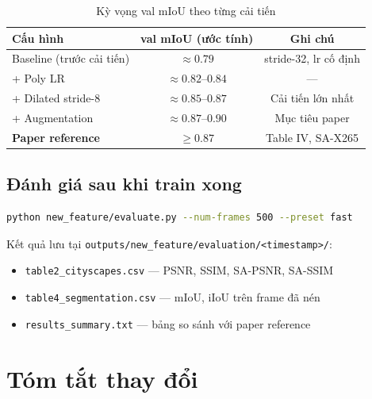 \documentclass[12pt,a4paper]{article}
\begin{document}
\begin{table}[H]
  \centering
  \caption{Kỳ vọng val mIoU theo từng cải tiến}
  \begin{tabular}{lcc}
    \toprule
    \textbf{Cấu hình} & \textbf{val mIoU (ước tính)} & \textbf{Ghi chú} \\
    \midrule
    Baseline (trước cải tiến) & $\approx 0.79$ & stride-32, lr cố định \\
    + Poly LR & $\approx 0.82$–$0.84$ & — \\
    + Dilated stride-8 & $\approx 0.85$–$0.87$ & Cải tiến lớn nhất \\
    + Augmentation & $\approx 0.87$–$0.90$ & Mục tiêu paper \\
    \midrule
    \textbf{Paper reference} & $\mathbf{\geq 0.87}$ & Table IV, SA-X265 \\
    \bottomrule
  \end{tabular}
\end{table}

\subsection{Đánh giá sau khi train xong}

\begin{lstlisting}[language=bash, caption={Chạy evaluate trên toàn bộ val set}]
python new_feature/evaluate.py --num-frames 500 --preset fast
\end{lstlisting}

Kết quả lưu tại \texttt{outputs/new\_feature/evaluation/<timestamp>/}:
\begin{itemize}
  \item \texttt{table2\_cityscapes.csv} — PSNR, SSIM, SA-PSNR, SA-SSIM
  \item \texttt{table4\_segmentation.csv} — mIoU, iIoU trên frame đã nén
  \item \texttt{results\_summary.txt} — bảng so sánh với paper reference
\end{itemize}

\section{Tóm tắt thay đổi}
\end{document}
